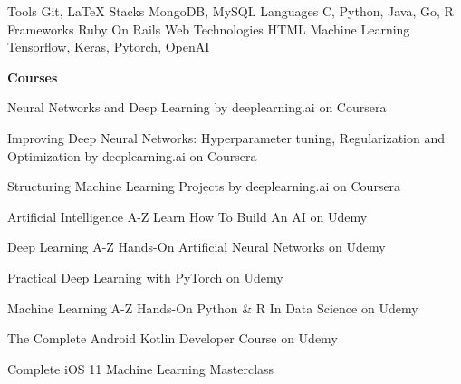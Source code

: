 



  \begin{cvskills}
  \cvskill
    {Tools}
    {Git, LaTeX} 
  \cvskill
    {Stacks}
    {MongoDB, MySQL}
  \cvskill
    {Languages}
    {C, Python, Java, Go, R}
  \cvskill
    {Frameworks}
    {Ruby On Rails}
  \cvskill
    {Web Technologies}
    {HTML}
  \cvskill
    {Machine Learning}
    {Tensorflow, Keras, Pytorch, OpenAI}
    

  \end{cvskills}


  \begin{cventries}

 \cventry
 {\bf Courses}
 {}
 {}
 {}
    {
      \begin{cvitems} %
        \item {Neural Networks and Deep Learning by deeplearning.ai on Coursera}
        \item {Improving Deep Neural Networks: Hyperparameter tuning, Regularization and Optimization by deeplearning.ai on Coursera}
        \item {Structuring Machine Learning Projects by deeplearning.ai on Coursera}
        \item {Artificial Intelligence A-Z Learn How To Build An AI on Udemy}
        \item {Deep Learning A-Z Hands-On Artificial Neural Networks on Udemy}
        \item {Practical Deep Learning with PyTorch on Udemy}
        \item {Machine Learning A-Z Hands-On Python \& R In Data Science on Udemy}
        \item {The Complete Android Kotlin Developer Course on Udemy}
        \item {Complete iOS 11 Machine Learning Masterclass}
      \end{cvitems}
    }

\end{cventries}
\vspace{30mm}